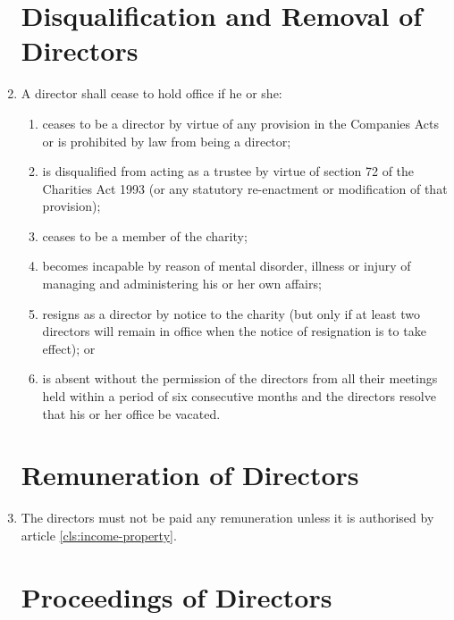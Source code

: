 \begin{enumerate}
\section{Disqualification and Removal of Directors}

\item \label{director-cease}
  A director shall cease to hold office if he or she:
  \begin{enumerate}
    \item
    ceases to be a director by virtue of any provision in the
    Companies Acts or is prohibited by law from being a director; 
    \item
    is disqualified from acting as a trustee by virtue of section 72 of
    the Charities Act 1993 (or any statutory re-enactment or
    modification of that provision);
    \item
    ceases to be a member of the charity; 
    \item
    becomes incapable by reason of mental disorder, illness
    or injury of managing and administering his or her own affairs;
    \item 
    resigns as a director by notice to the charity (but only if at
    least two directors will remain in office when the notice of
    resignation is to take effect); or 
    \item 
    is absent without the
    permission of the directors from all their meetings held within a
    period of six consecutive months and the directors resolve that his
    or her office be vacated.
  \end{enumerate}

\section{Remuneration of Directors}

\item
  The directors must not be paid any remuneration unless it is
  authorised by article \ref{cls:income-property}.

\section{Proceedings of Directors}


\end{enumerate}

